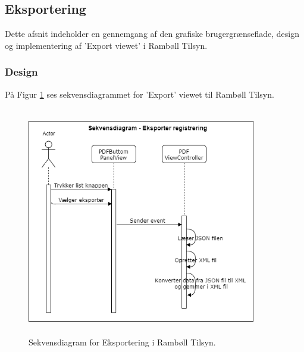 \subsection{Eksportering} \label{sec:Eksport}
Dette afsnit indeholder en gennemgang af den grafiske brugergrænseflade, design og implementering af 'Export viewet' i Rambøll Tilsyn.

\subsubsection{Design}
På Figur \ref{fig:EksporterSekvensDiagram} ses sekvensdiagrammet for 'Export' viewet til Rambøll Tilsyn.
\begin{figure}[H] %
	\centering
	\includegraphics[height=10cm, width=10cm]{../ArkitekturDesign/Design/Eksportering/EksporterSekvensDiagram}
	\caption{Sekvensdiagram for Eksportering i Rambøll Tilsyn.}
	\label{fig:EksporterSekvensDiagram}
\end{figure}

\clearpage

